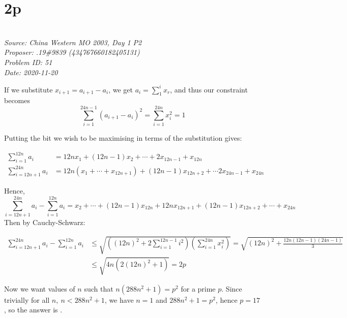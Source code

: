 \documentclass[titlepage=true]{scrartcl}
\begin{document}
\newpage 

\section{2p}

\SSbreak\\
\emph{Source: China Western MO 2003, Day 1 P2}\\
\emph{Proposer: .19\#9839 (434767660182405131)}\\
\emph{Problem ID: 51}\\
\emph{Date: 2020-11-20}\\
\SSbreak

\bigskip

\begin{solution}\hfil\medskip

    If we substitute \(x_{i+1}=a_{i+1}-a_i\), we get \(a_i=\sum_1^i x_r\), and thus our constraint becomes 
    \begin{equation*}
        \sum_{i=1}^{24n-1}(a_{i+1}-a_i)^2=\sum_{i=1}^{24n}x^2_i=1
    \end{equation*}
    
    Putting the bit we wish to be maximising in terms of the substitution gives:

    \begin{align*}
        \sum_{i=1}^{12n}a_i&=12nx_1+(12n-1)x_2+\cdots+2x_{12n-1}+x_{12n}\\
        \sum_{i=12n+1}^{24n}a_i&=12n(x_1+\cdots+x_{12n+1})+(12n-1)x_{12n+2}+\cdots 2x_{24n-1}+x_{24n}
    \end{align*}

    Hence, 
    \begin{equation*}
        \sum_{i=12n+1}^{24n}a_i-\sum_{i=1}^{12n}a_i=x_2+\cdots+(12n-1)x_{12n}+12nx_{12n+1}+(12n-1)x_{12n+2}+\cdots+x_{24n}
    \end{equation*}
    Then by Cauchy-Schwarz: 

    \begin{align*}
        \sum_{i=12n+1}^{24n}a_i-\sum_{i=1}^{12n}a_i&\leq \sqrt{\left((12n)^2+2\sum_{i=1}^{12n-1}i^2\right)\left(\sum_{i=1}^{24n}x_i^2\right)}=\sqrt{(12n)^2+\frac{12n(12n-1)(24n-1)}{3}}\\
        &\leq\sqrt{4n(2(12n)^2+1)}=2p
    \end{align*}

    Now we want values of \(n\) such that \(n(288n^2+1)=p^2\) for a prime \(p\). Since trivially for all \(n,\ n<288n^2+1\), we have \(n=1\) and \(288n^2+1=p^2\), hence \(p=17\), so the answer is .
\end{solution}
\end{document}

